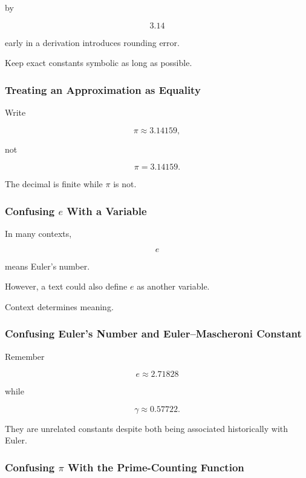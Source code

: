by

\[
3.14
\]

early in a derivation introduces rounding error.

Keep exact constants symbolic as long as possible.

\subsubsection{Treating an Approximation as Equality}

Write

\[
\boxed{
\pi
\approx
3.14159,
}
\]

not

\[
\pi
=
3.14159.
\]

The decimal is finite while \(\pi\) is not.

\subsubsection{Confusing \(e\) With a Variable}

In many contexts,

\[
e
\]

means Euler's number.

However, a text could also define \(e\) as another variable.

Context determines meaning.

\subsubsection{Confusing Euler's Number and Euler--Mascheroni Constant}

Remember

\[
\boxed{
e
\approx
2.71828
}
\]

while

\[
\boxed{
\gamma
\approx
0.57722.
}
\]

They are unrelated constants despite both being associated historically with
Euler.

\subsubsection{Confusing \(\pi\) With the Prime-Counting Function}


